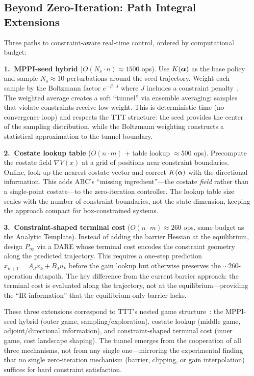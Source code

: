 \subsection{Beyond Zero-Iteration: Path Integral Extensions}
\label{sec:extensions}

Three paths to constraint-aware real-time control, ordered by
computational budget:

\textbf{1.\ MPPI-seed hybrid}
($O(N_s \cdot n) \approx 1500$ ops).
Use $K(\bm{\alpha})$ as the base policy and sample $N_s \approx 10$
perturbations around the seed trajectory.
Weight each sample by the Boltzmann factor
$e^{-\beta \cdot J}$ where $J$ includes a constraint
penalty~\cite{williams2017}.
The weighted average creates a soft ``tunnel'' via ensemble
averaging: samples that violate constraints receive low weight.
This is deterministic-time (no convergence loop) and respects
the TTT structure: the seed provides the center of the sampling
distribution, while the Boltzmann weighting constructs a
statistical approximation to the tunnel boundary.

\textbf{2.\ Costate lookup table}
($O(n \cdot m)$ + table lookup $\approx 500$ ops).
Precompute the costate field
$\nabla V(x)$ at a grid of positions near constraint
boundaries.
Online, look up the nearest costate vector and correct
$K(\bm{\alpha})$ with the directional information.
This adds ABC's ``missing ingredient''---the costate
\emph{field} rather than a single-point costate---to the
zero-iteration controller.
The lookup table size scales with the number of constraint
boundaries, not the state dimension, keeping the approach
compact for box-constrained systems.

\textbf{3.\ Constraint-shaped terminal cost}
($O(n \cdot m) \approx 260$ ops, same budget as the
Analytic Template).
Instead of adding the barrier Hessian at the equilibrium,
design $P_\infty$ via a DARE whose terminal cost encodes
the constraint geometry along the predicted trajectory.
This requires a one-step prediction
$x_{k+1} = A_d x_k + B_d u_k$ before the gain lookup
but otherwise preserves the ${\sim}260$-operation datapath.
The key difference from the current barrier approach:
the terminal cost is evaluated along the trajectory,
not at the equilibrium---providing the ``IR information''
that the equilibrium-only barrier lacks.

These three extensions correspond to TTT's nested game
structure~\cite{zhang2026ttt}: the MPPI-seed hybrid
(outer game, sampling/exploration), costate lookup
(middle game, adjoint/directional information), and
constraint-shaped terminal cost (inner game, cost landscape
shaping).
The tunnel emerges from the cooperation of all three
mechanisms, not from any single one---mirroring the
experimental finding that no single zero-iteration mechanism
(barrier, clipping, or gain interpolation) suffices for
hard constraint satisfaction.

